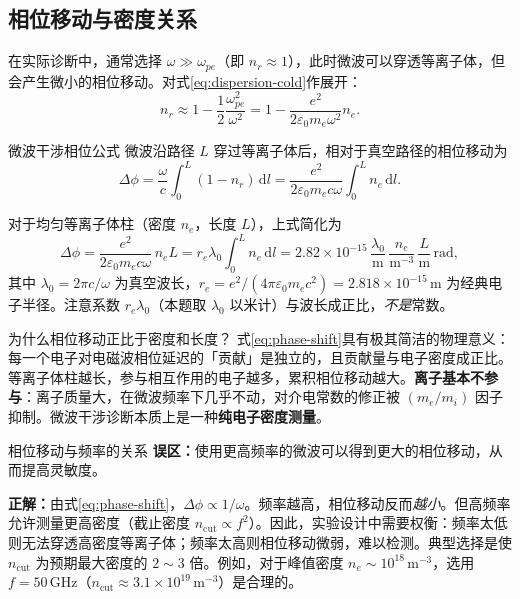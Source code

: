 \documentclass[12pt,a4paper,openany,oneside]{book}
\newcommand{\diff}{\mathrm{d}}
\newcommand{\eps}{\varepsilon}
\begin{document}
\subsection{相位移动与密度关系}

在实际诊断中，通常选择 $\omega \gg \omega_{pe}$（即 $n_r \approx 1$），此时微波可以穿透等离子体，但会产生微小的相位移动。对式\eqref{eq:dispersion-cold}作展开：
\begin{equation}
n_r \approx 1 - \frac{1}{2}\frac{\omega_{pe}^2}{\omega^2}
= 1 - \frac{e^2}{2\eps_0 m_e \omega^2} n_e.
\label{eq:ch12-refractive-index}
\end{equation}

\begin{theorem}{微波干涉相位公式}{}{}
微波沿路径 $L$ 穿过等离子体后，相对于真空路径的相位移动为
\begin{equation}
\Delta\phi = \frac{\omega}{c}\int_0^L (1 - n_r)\,\diff l
= \frac{e^2}{2\eps_0 m_e c \omega} \int_0^L n_e\,\diff l.
\label{eq:phase-shift}
\end{equation}

对于均匀等离子体柱（密度 $n_e$，长度 $L$），上式简化为
\begin{equation}
\Delta\phi = \frac{e^2}{2\eps_0 m_e c \omega}\, n_e L
= r_e\lambda_0 \int_0^L n_e\,\diff l
= 2.82\times 10^{-15}\,\frac{\lambda_0}{\mathrm{m}} \,\frac{n_e}{\mathrm{m}^{-3}}\,\frac{L}{\mathrm{m}}\,\mathrm{rad},
\label{eq:phase-shift-uniform}
\end{equation}
其中 $\lambda_0 = 2\pi c/\omega$ 为真空波长，$r_e = e^2/(4\pi\eps_0 m_e c^2) = 2.818\times 10^{-15}\,\mathrm{m}$ 为经典电子半径。注意系数 $r_e\lambda_0$（本题取 $\lambda_0$ 以米计）与波长成正比，\emph{不是}常数。
\end{theorem}

\begin{insight}{为什么相位移动正比于密度和长度？}{}
式\eqref{eq:phase-shift}具有极其简洁的物理意义：每一个电子对电磁波相位延迟的「贡献」是独立的，且贡献量与电子密度成正比。等离子体柱越长，参与相互作用的电子越多，累积相位移动越大。\textbf{离子基本不参与}：离子质量大，在微波频率下几乎不动，对介电常数的修正被 $(m_e/m_i)$ 因子抑制。微波干涉诊断本质上是一种\textbf{纯电子密度测量}。
\end{insight}

\begin{warning}{相位移动与频率的关系}{}
\textbf{误区：}使用更高频率的微波可以得到更大的相位移动，从而提高灵敏度。

\textbf{正解：}由式\eqref{eq:phase-shift}，$\Delta\phi \propto 1/\omega$。频率越高，相位移动反而\emph{越小}。但高频率允许测量更高密度（截止密度 $n_{\mathrm{cut}} \propto f^2$）。因此，实验设计中需要权衡：频率太低则无法穿透高密度等离子体；频率太高则相位移动微弱，难以检测。典型选择是使 $n_{\mathrm{cut}}$ 为预期最大密度的 $2\sim 3$ 倍。例如，对于峰值密度 $n_e \sim 10^{18}\,\mathrm{m}^{-3}$，选用 $f = 50\,\mathrm{GHz}$（$n_{\mathrm{cut}} \approx 3.1\times 10^{19}\,\mathrm{m}^{-3}$）是合理的。
\end{warning}
\end{document}
